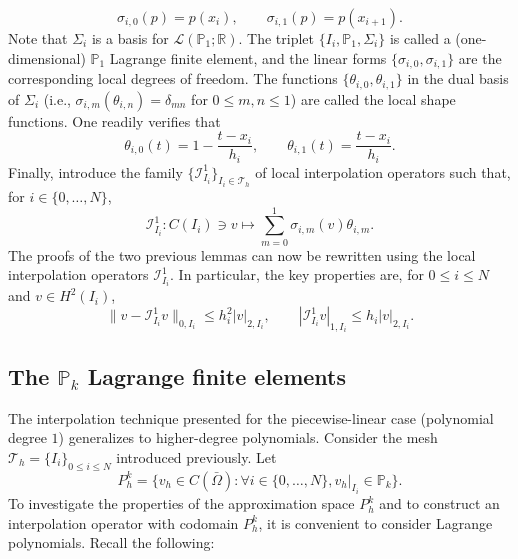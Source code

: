 \begin{equation*}
\sigma_{i,0}(p) = p(x_i),\qquad \sigma_{i,1}(p) = p(x_{i+1}).
\end{equation*}
Note that $\Sigma_i$ is a basis for $\mathcal{L}(\mathbb{P}_1; \mathbb{R})$. The triplet $\{I_i, \mathbb{P}_1, \Sigma_i\}$ is called a (one-dimensional) $\mathbb{P}_1$ Lagrange finite element, and the linear forms $\{\sigma_{i,0}, \sigma_{i,1}\}$ are the corresponding local degrees of freedom. The functions $\{\theta_{i,0}, \theta_{i,1}\}$ in the dual basis of $\Sigma_i$ (i.e., $\sigma_{i,m}(\theta_{i,n}) = \delta_{mn}$ for $0 \le m, n \le 1$) are called the local shape functions. One readily verifies that
\begin{equation*}
\theta_{i,0}(t) = 1 - \frac{t - x_i}{h_i},\qquad \theta_{i,1}(t) = \frac{t - x_i}{h_i}.
\end{equation*}
Finally, introduce the family $\{\mathcal{I}_{I_i}^1\}_{I_i \in \mathcal{T}_h}$ of local interpolation operators such that, for $i \in \{0, \dots, N\}$,
\begin{equation*}
\mathcal{I}_{I_i}^1: C(I_i) \ni v \mapsto \sum_{m=0}^1 \sigma_{i,m}(v) \theta_{i,m}.
\end{equation*}
The proofs of the two previous lemmas can now be rewritten using the local interpolation operators $\mathcal{I}_{I_i}^1$. In particular, the key properties are, for $0 \le i \le N$ and $v \in H^2(I_i)$,
\begin{equation*}
\|v - \mathcal{I}_{I_i}^1 v\|_{0,I_i} \le h_i^2 |v|_{2,I_i},\qquad|\mathcal{I}_{I_i}^1 v|_{1,I_i} \le h_i |v|_{2,I_i}.
\end{equation*}

\subsection{The $\mathbb{P}_k$ Lagrange finite elements}
The interpolation technique presented for the piecewise-linear case (polynomial degree $1$) generalizes to higher-degree polynomials. Consider the mesh $\mathcal{T}_h = \{I_i\}_{0 \le i \le N}$ introduced previously. Let
\begin{equation*}
P_h^k = \{ v_h \in C(\bar{\Omega}): \forall i \in \{0, \dots, N\}, v_h|_{I_i} \in \mathbb{P}_k \}.
\end{equation*}
To investigate the properties of the approximation space $P_h^k$ and to construct an interpolation operator with codomain $P_h^k$, it is convenient to consider Lagrange polynomials. Recall the following:


